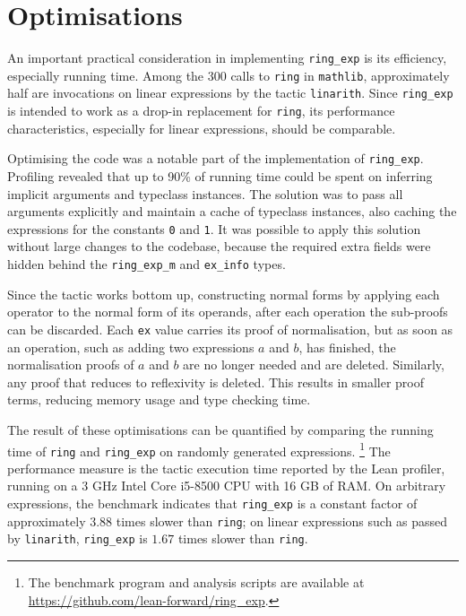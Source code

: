 \documentclass{llncs}
\newcommand{\lean}[1]{\texttt{#1}\xspace} %
\newcommand{\mathlib}{\texttt{mathlib}\xspace}
\newcommand{\ring}{\lean{ring}}
\newcommand{\ringexp}{\lean{ring\_exp}}
\begin{document}
\section{Optimisations}

An important practical consideration in implementing \ringexp is its efficiency, especially running time.
Among the 300 calls to \ring in \mathlib, approximately half are invocations on linear expressions by the tactic \lean{linarith}.
Since \ringexp is intended to work as a drop-in replacement for \lean{ring},
its performance characteristics, especially for linear expressions, should be comparable.

Optimising the code was a notable part of the implementation of \ringexp.
Profiling revealed that up to 90\% of running time could be spent on inferring implicit arguments and typeclass instances.
The solution was to pass all arguments explicitly and maintain a cache of typeclass instances,
also caching the expressions for the constants \lean{0} and \lean{1}.
It was possible to apply this solution without large changes to the codebase,
because the required extra fields were hidden behind the \lean{ring\_exp\_m} and \lean{ex\_info} types.

Since the tactic works bottom up,
constructing normal forms by applying each operator to the normal form of its operands,
after each operation the sub-proofs can be discarded.
Each \lean{ex} value carries its proof of normalisation,
but as soon as an operation, such as adding two expressions $a$ and $b$, has finished,
the normalisation proofs of $a$ and $b$ are no longer needed and are deleted.
Similarly, any proof that reduces to reflexivity is deleted.
This results in smaller proof terms, reducing memory usage and type checking time.


The result of these optimisations can be quantified by comparing the running time of \ring and \ringexp on randomly generated expressions.%
\footnote{The benchmark program and analysis scripts are available at \url{https://github.com/lean-forward/ring_exp}.}
The performance measure is the tactic execution time reported by the Lean profiler,
running on a 3 GHz Intel\textregistered\xspace Core\texttrademark\xspace i5-8500 CPU with 16 GB of RAM.
On arbitrary expressions, the benchmark indicates that \ringexp is a constant factor of approximately $3.88$ times slower than \ring;
on linear expressions such as passed by \lean{linarith}, 
\ringexp is $1.67$ times slower than \ring.
\end{document}
